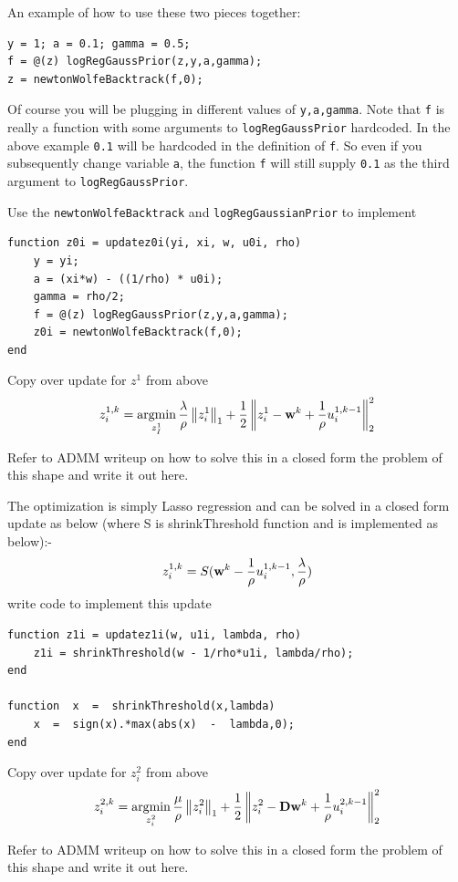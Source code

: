 \documentclass{article}
\begin{document}
{An example of how to use these two pieces together:
\begin{verbatim}
y = 1; a = 0.1; gamma = 0.5;
f = @(z) logRegGaussPrior(z,y,a,gamma);
z = newtonWolfeBacktrack(f,0);
\end{verbatim}
Of course you will be plugging in different values of \texttt{y,a,gamma}. Note that \texttt{f} is really a function with some arguments to \texttt{logRegGaussPrior} hardcoded. In the above example \texttt{0.1} will be hardcoded in the definition of \texttt{f}.  So even if you subsequently change variable \texttt{a}, the function \texttt{f} will still supply \texttt{0.1} as the third argument to \texttt{logRegGaussPrior}.

Use the \texttt{newtonWolfeBacktrack} and \texttt{logRegGaussianPrior} to implement
\begin{verbatim}
function z0i = updatez0i(yi, xi, w, u0i, rho)
    y = yi;    
    a = (xi*w) - ((1/rho) * u0i);
    gamma = rho/2;
    f = @(z) logRegGaussPrior(z,y,a,gamma);
    z0i = newtonWolfeBacktrack(f,0);    
end
\end{verbatim}

\newproblem{1pt} Copy over update for $z^1$ from above
\[
z_i^{1,k} = \mathop{\rm argmin}_{z_I^1}   \frac{\lambda}{\rho}\left\lVert z_{i}^{1}\right\rVert_1 + \frac{1}{2} \left\lVert z_{i}^{1} - \mathbf{w}^{k} + \frac{1}{\rho}u_{i}^{1,k-1}\right\rVert_2^{2}
\]

Refer to ADMM writeup on how to solve this in a closed form the problem of this shape and write it out here.

The optimization is simply Lasso regression and can be solved in a closed form update as below (where S is shrinkThreshold function and is implemented as below):-
\[
z_i^{1,k} = S(\mathbf{w}^{k} - \frac{1}{\rho}u_{i}^{1,k-1}, \frac{\lambda}{\rho}) 
\]
write code to implement this update
\begin{verbatim}
function z1i = updatez1i(w, u1i, lambda, rho)
    z1i = shrinkThreshold(w - 1/rho*u1i, lambda/rho);        
end

function  x  =  shrinkThreshold(x,lambda)
    x  =  sign(x).*max(abs(x)  -  lambda,0);
end
\end{verbatim}


\newproblem{1pt} Copy over update for $z_i^2$ from above
\[
z_i^{2,k} = \mathop{\rm argmin}_{z_i^2}   \frac{\mu}{\rho} \left\lVert z_{i}^{2}\right\rVert_1 + \frac{1}{2} \left\lVert z_{i}^{2} - \mathbf{D}\mathbf{w}^{k} + \frac{1}{\rho}u_{i}^{2,k-1}\right\rVert_2^{2} 
\]

Refer to ADMM writeup on how to solve this in a closed form the problem of this shape and write it out here.

}
\end{document}
